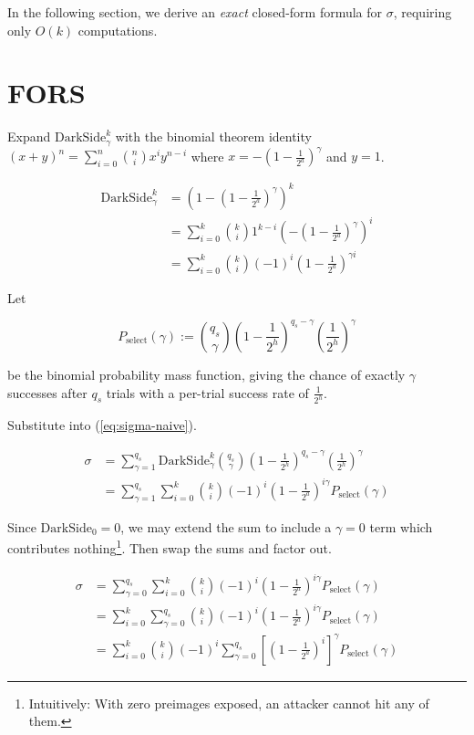 \documentclass[11pt]{article}
\begin{document}
In the following section, we derive an \emph{exact} closed-form formula for $\sigma$, requiring only $O(k)$ computations.

\section{FORS}
\label{sec:fors}

Expand $\mathrm{DarkSide}^k_\gamma$ with the binomial theorem identity $(x + y)^n = \sum_{i=0}^n \binom{n}{i} x^i y^{n-i}$ where $x = - \left( 1 - \frac{1}{2^a} \right)^\gamma$ and $y=1$.

\begin{align}
  \mathrm{DarkSide}^k_\gamma
    &= \left( 1 - \left( 1 - \frac{1}{2^a} \right)^\gamma \right)^k \\
    &= \sum_{i=0}^k \binom{k}{i} 1^{k-i} \left(- \left(1 - \frac{1}{2^a} \right)^\gamma \right)^i \\
    &= \sum_{i=0}^k \binom{k}{i} (-1)^i \left( 1 - \frac{1}{2^a} \right)^{\gamma i} \label{eq:darkside-binomial}
\end{align}

Let

\begin{equation}
  P_\text{select}(\gamma) := \binom{q_s}{\gamma} \left( 1 - \frac{1}{2^h} \right)^{q_s - \gamma} \left( \frac{1}{2^h} \right)^\gamma
\end{equation}

be the binomial probability mass function, giving the chance of exactly $\gamma$ successes after $q_s$ trials with a per-trial success rate of $\frac{1}{2^h}$.

Substitute into (\ref{eq:sigma-naive}).

\begin{align}
  \sigma &= \sum_{\gamma=1}^{q_s} \mathrm{DarkSide}^k_\gamma \binom{q_s}{\gamma} \left( 1 - \frac{1}{2^h} \right)^{q_s - \gamma} \left( \frac{1}{2^{h}} \right)^\gamma \\
         &= \sum_{\gamma=1}^{q_s} \sum_{i=0}^k \binom{k}{i} (-1)^i \left( 1 - \frac{1}{2^a} \right)^{i \gamma} P_\text{select}(\gamma)
\end{align}

Since $\mathrm{DarkSide}_0 = 0$, we may extend the sum to include a $\gamma = 0$ term which contributes nothing\footnote{Intuitively: With zero preimages exposed, an attacker cannot hit any of them.}. Then swap the sums and factor out.

\begin{align}
  \sigma &= \sum_{\gamma=0}^{q_s} \sum_{i=0}^k \binom{k}{i} (-1)^i \left( 1 - \frac{1}{2^a} \right)^{i \gamma} P_\text{select}(\gamma)\\
         &= \sum_{i=0}^k \sum_{\gamma=0}^{q_s} \binom{k}{i} (-1)^i \left( 1 - \frac{1}{2^a} \right)^{i \gamma} P_\text{select}(\gamma) \\
         &= \sum_{i=0}^k \binom{k}{i} (-1)^i \sum_{\gamma=0}^{q_s} \left[ \left( 1 - \frac{1}{2^a} \right)^i \right]^\gamma P_\text{select}(\gamma)
\end{align}
\end{document}
